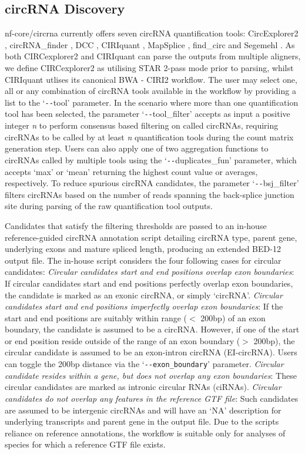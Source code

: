 \documentclass{bmcart}
\begin{document}
\subsection*{\textbf{circRNA Discovery}}
nf-core/circrna currently offers seven circRNA quantification tools: CircExplorer2 \cite{circexplorer2}, circRNA\_finder \cite{circrna-finder}, DCC \cite{DCC}, CIRIquant \cite{CIRIquant}, MapSplice \cite{MapSplice}, find\_circ \cite{Memczak2013} and Segemehl \cite{segemehl}. As both CIRCexplorer2 and CIRIquant can parse the outputs from multiple aligners, we define CIRCexplorer2 as utilising STAR \cite{STAR} 2-pass mode prior to parsing, whilst CIRIquant utlises its canonical BWA \cite{BWA} - CIRI2 \cite{CIRI} workflow. The user may select one, all or any combination of circRNA tools available in the workflow by providing a list to the `\texttt{-{}-}tool' parameter. In the scenario where more than one quantification tool has been selected, the parameter `\texttt{-{}-}tool\_filter' accepts as input a positive integer \textit{n} to perform consensus based filtering on called circRNAs, requiring circRNAs to be called by at least \textit{n} quantification tools during the count matrix generation step. Users can also apply one of two aggregation functions to circRNAs called by multiple tools using the `\texttt{-{}-}duplicates\_fun' parameter, which accepts `max' or `mean' returning the highest count value or averages, respectively. To reduce spurious circRNA candidates, the parameter `\texttt{-{}-}bsj\_filter' filters circRNAs based on the number of reads spanning the back-splice junction site during parsing of the raw quantification tool outputs.
\par 
Candidates that satisfy the filtering thresholds are passed to an in-house reference-guided circRNA annotation script detailing circRNA type, parent gene, underlying exons and mature spliced length, producing an extended BED-12 output file. The in-house script considers the four following cases for circular candidates: \textit{Circular candidates start and end positions overlap exon boundaries}: If circular candidates start and end positions perfectly overlap exon boundaries, the
candidate is marked as an exonic circRNA, or simply ‘circRNA’. \textit{Circular candidates start and end positions imperfectly overlap exon boundaries}: If the start and end positions are suitably within range ($<$ 200bp) of an exon boundary, the candidate is assumed to be a circRNA. However, if one of the start or end position reside outside of the range of an exon boundary ($>$ 200bp), the circular candidate is assumed to be an exon-intron circRNA (EI-circRNA). Users can toggle the 200bp distance via the `\texttt{-{}-exon\_boundary}' parameter. \textit{Circular candidate resides within a gene, but does not overlap any exon boundaries}: These circular candidates are marked as intronic circular RNAs (ciRNAs). \textit{Circular candidates do not overlap any features in the reference GTF file}: Such candidates are assumed to be intergenic circRNAs and will have an `NA' description for underlying transcripts and parent gene in the output file. Due to the scripts reliance on reference annotations, the workflow is suitable only for analyses of species for which a reference GTF file exists.
\end{document}
